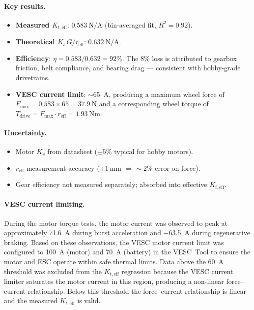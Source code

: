 \documentclass[11pt,a4paper]{article}
\begin{document}
\paragraph{Key results.}
\begin{itemize}
  \item \textbf{Measured $K_{t,\text{eff}}$}:
        $\SI{0.583}{\newton\per\ampere}$ (bin-averaged fit, $R^2 = 0.92$).
  \item \textbf{Theoretical $K_t\,G/r_\text{eff}$}:
        $\SI{0.632}{\newton\per\ampere}$.
  \item \textbf{Efficiency}: $\eta = 0.583/0.632 = 92\%$.
        The 8\% loss is attributed to gearbox friction, belt compliance,
        and bearing drag --- consistent with hobby-grade drivetrains.
  \item \textbf{VESC current limit}: $\sim$\SI{65}{\ampere}, producing
        a maximum wheel force of
        $F_\text{max} = 0.583 \times 65 = \SI{37.9}{\newton}$
        and a corresponding wheel torque of
        $T_\text{drive} = F_\text{max} \cdot r_\text{eff}
        = \SI{1.93}{\newton\metre}$.
\end{itemize}

\paragraph{Uncertainty.}
\begin{itemize}
  \item Motor $K_v$ from datasheet ($\pm5\%$ typical for hobby motors).
  \item $r_\text{eff}$ measurement accuracy ($\pm\SI{1}{\milli\metre}$
        $\Rightarrow \sim 2\%$ error on force).
  \item Gear efficiency not measured separately; absorbed into
        effective $K_{t,\text{eff}}$.
\end{itemize}

\paragraph{VESC current limiting.}
During the motor torque tests, the motor current was observed to peak
at approximately \SI{71.6}{\ampere} during burst acceleration and
\SI{-63.5}{\ampere} during regenerative braking.  Based on these
observations, the VESC motor current limit was configured to
\SI{100}{\ampere} (motor) and \SI{70}{\ampere} (battery) in the
VESC~Tool to ensure the motor and ESC operate within safe thermal
limits.  Data above the \SI{60}{\ampere} threshold was excluded from
the $K_{t,\text{eff}}$ regression because the VESC current limiter
saturates the motor current in this region, producing a non-linear
force--current relationship.  Below this threshold the force--current
relationship is linear and the measured $K_{t,\text{eff}}$ is valid.
\end{document}
